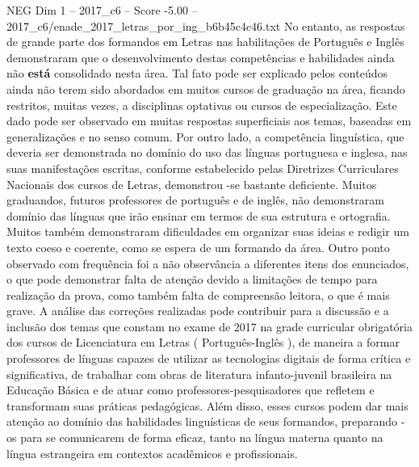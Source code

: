 \begin{textsample}{NEG Dim 1 – 2017\_c6 – Score -5.00 – 2017\_c6/enade\_2017\_letras\_por\_ing\_b6b45c4c46.txt}
No entanto, as respostas de grande parte dos formandos em Letras nas habilitações de Português e Inglês demonstraram que o desenvolvimento destas competências e habilidades ainda não \textbf{está} consolidado nesta área.
Tal fato pode ser explicado pelos conteúdos ainda não terem sido abordados em muitos cursos de graduação na área, ficando restritos, muitas vezes, a disciplinas optativas ou cursos de especialização.
Este dado pode ser observado em muitas respostas superficiais aos temas, baseadas em generalizações e no senso comum.
Por outro lado, a competência linguística, que deveria ser demonstrada no domínio do uso das línguas portuguesa e inglesa, nas suas manifestações escritas, conforme estabelecido pelas Diretrizes Curriculares Nacionais dos cursos de Letras, demonstrou -se bastante deficiente.
Muitos graduandos, futuros professores de português e de inglês, não demonstraram domínio das línguas que irão ensinar em termos de sua estrutura e ortografia.
Muitos também demonstraram dificuldades em organizar suas ideias e redigir um texto coeso e coerente, como se espera de um formando da área.
Outro ponto observado com frequência foi a não observância a diferentes itens dos enunciados, o que pode demonstrar falta de atenção devido a limitações de tempo para realização da prova, como também falta de compreensão leitora, o que é mais grave.
A análise das correções realizadas pode contribuir para a discussão e a inclusão dos temas que constam no exame de 2017 na grade curricular obrigatória dos cursos de Licenciatura em Letras ( Português-Inglês ), de maneira a formar professores de línguas capazes de utilizar as tecnologias digitais de forma crítica e significativa, de trabalhar com obras de literatura infanto-juvenil brasileira na Educação Básica e de atuar como professores-pesquisadores que refletem e transformam suas práticas pedagógicas.
Além disso, esses cursos podem dar mais atenção ao domínio das habilidades linguísticas de seus formandos, preparando -os para se comunicarem de forma eficaz, tanto na língua materna quanto na língua estrangeira em contextos acadêmicos e profissionais.

\end{textsample}
